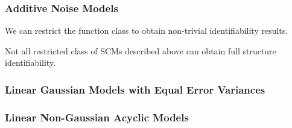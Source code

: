 \documentclass{beamer}
\begin{document}
\begin{frame}
    \frametitle{Additive Noise Models}
    \begin{flushleft}
        We can restrict the function class to obtain non-trivial identifiability results.
    \end{flushleft} 
    \begin{flushleft}
        Not all restricted class of SCMs described above can obtain full structure identifiability.
    \end{flushleft} 
\end{frame}

\begin{frame}
    \frametitle{Linear Gaussian Models with Equal Error Variances}
\end{frame}

\begin{frame}
    \frametitle{Linear Non-Gaussian Acyclic Models}
\end{frame}
\end{document}
